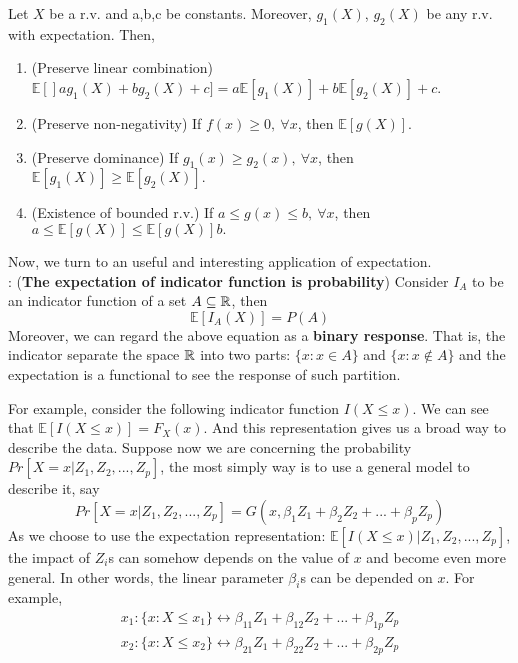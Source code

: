 \documentclass[../Transformation.tex]{subfiles}
\begin{document}
\begin{property}
	Let $X$ be a r.v. and a,b,c be constants. Moreover, $g_1(X)$, $g_2(X)$ be any r.v. with expectation. Then,
	\begin{enumerate}
		\item (Preserve linear combination) $\mathbb{E}[]ag_1(X)+bg_2(X)+c]=a\mathbb{E}[g_1(X)] + b\mathbb{E}[g_2(X)] + c$.
		\item (Preserve non-negativity) If $f(x)\geq0,\ \forall x$, then $\mathbb{E}[g(X)]$.
		\item (Preserve dominance) If $g_1(x)\geq g_2(x),\ \forall x$, then $\mathbb{E}[g_1(X)]\geq\mathbb{E}[g_2(X)].$
		\item (Existence of bounded r.v.) If $a\leq g(x) \leq b,\ \forall x$, then $a\leq \mathbb{E}[g(X)]\leq\mathbb{E}[g(X)] b.$
	\end{enumerate}
\end{property}

Now, we turn to an useful and interesting application of expectation.\\

: ({\bf The expectation of indicator function is probability})
Consider $I_A$ to be an indicator function of a set $A\subseteq{\mathbb R}$, then
$$\mathbb{E}[I_A(X)] = P(A)$$
Moreover, we can regard the above equation as a {\bf binary response}. That is, the indicator separate the space ${\mathbb R}$ into two parts: $\{x:x\in A\}$ and $\{x:x\notin A \}$ and the expectation is a functional to see the response of such partition.

For example, consider the following indicator function $I(X\leq x)$. We can see that $\mathbb{E}[I(X\leq x)] = F_X(x)$. And this representation gives us a broad way to describe the data. Suppose now we are concerning the probability $Pr[X=x|Z_1,Z_2,...,Z_p]$, the most simply way is to use a general model to describe it, say
$$Pr[X=x|Z_1,Z_2,...,Z_p] = G(x,\beta_1Z_1+\beta_2Z_2+...+\beta_pZ_p)$$
As we choose to use the expectation representation: $\mathbb{E}[I(X\leq x)|Z_1,Z_2,...,Z_p]$, the impact of $Z_i$s can somehow depends on the value of $x$ and become even more general. In other words, the linear parameter $\beta_i$s can be depended on $x$. For example,
\begin{align*}
x_1: \{x:X\leq x_1 \}\leftrightarrow \beta_{11}Z_1+\beta_{12}Z_2+...+\beta_{1p}Z_p\\
x_2: \{x:X\leq x_2 \}\leftrightarrow \beta_{21}Z_1+\beta_{22}Z_2+...+\beta_{2p}Z_p
\end{align*}
\end{document}
